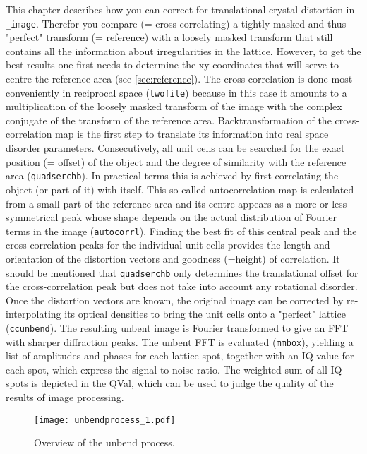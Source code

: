 This chapter describes how you can correct for translational crystal distortion in {\twodx}\texttt{\_image}. Therefor you compare (= cross-correlating) a tightly masked and thus "perfect" transform (= reference) with a loosely masked transform that still contains all the information about irregularities in the lattice. However, to get the best results one first needs to determine the xy-coordinates that will serve to centre the reference area (see  \autoref{sec:reference}). The cross-correlation is done most conveniently in reciprocal space (\texttt{twofile}) because in this case it amounts to a multiplication of the loosely masked transform of the image with the complex conjugate of the transform of the reference area. Backtransformation of the cross-correlation map is the first step to translate its information into real space disorder parameters. Consecutively, all unit cells can be searched for the exact position (= offset) of the object and the degree of similarity with the reference area (\texttt{quadserchb}). In practical terms this is achieved by first correlating the object (or part of it) with itself. This so called autocorrelation map is calculated from a small part of the reference area and its centre appears as a more or less symmetrical peak whose shape depends on the actual distribution of Fourier terms in the image (\texttt{autocorrl}). Finding the best fit of this central peak and the cross-correlation peaks for the individual unit cells provides the length and orientation of the distortion vectors and goodness (=height) of correlation. It should be mentioned that \texttt{quadserchb} only determines the translational offset for the cross-correlation peak but does not take into account any rotational disorder. Once the distortion vectors are known, the original image can be corrected by re-interpolating its optical densities to bring the unit cells onto a "perfect" lattice (\texttt{ccunbend}). The resulting unbent image is Fourier transformed to give an FFT with sharper diffraction peaks. The unbent FFT is evaluated (\texttt{mmbox}), yielding a list of amplitudes and phases for each lattice spot, together with an IQ value for each spot, which express the signal-to-noise ratio. The weighted sum of all IQ spots is depicted in the QVal, which can be used to judge the quality of the results of image processing.

\begin{figure}[H]
		\centering
		\texttt{[image: unbendprocess\_1.pdf]}
		\caption{Overview of the unbend process.}
		\label{fig:unbendprocess_1}
	\end{figure}



